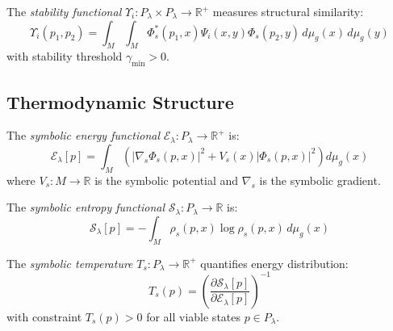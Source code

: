\begin{definition}
\label{definition:bk6_stability_functional_complete}
The \emph{stability functional} $\Upsilon_i : P_{\lambda} \times P_{\lambda} \to \mathbb{R}^+$ measures structural similarity:
\begin{equation}
\Upsilon_i(p_1, p_2) = \int_M \int_M \Phi_s^*(p_1, x) \Psi_i(x, y) \Phi_s(p_2, y) \, d\mu_g(x) \, d\mu_g(y)
\end{equation}
with stability threshold $\gamma_{\min} > 0$.
\end{definition}

\subsection{Thermodynamic Structure}
\label{subsection:bk6_thermodynamic_structure}

\begin{definition}
\label{definition:bk6_symbolic_energy_functional}
The \emph{symbolic energy functional} $\mathcal{E}_\lambda : P_\lambda \to \mathbb{R}^+$ is:
\begin{equation}
\mathcal{E}_\lambda[p] = \int_M \left(|\nabla_s \Phi_s(p,x)|^2 + V_s(x)|\Phi_s(p,x)|^2\right) d\mu_g(x)
\end{equation}
where $V_s : M \to \mathbb{R}$ is the symbolic potential and $\nabla_s$ is the symbolic gradient.
\end{definition}

\begin{definition}
\label{definition:bk6_symbolic_entropy_functional}
The \emph{symbolic entropy functional} $\mathcal{S}_\lambda : P_\lambda \to \mathbb{R}$ is:
\begin{equation}
\mathcal{S}_\lambda[p] = -\int_M \rho_s(p,x) \log \rho_s(p,x) \, d\mu_g(x)
\end{equation}
\end{definition}

\begin{definition}
\label{definition:bk6_symbolic_temperature}
The \emph{symbolic temperature} $T_s : P_\lambda \to \mathbb{R}^+$ quantifies energy distribution:
\begin{equation}
T_s(p) = \left(\frac{\partial \mathcal{S}_\lambda[p]}{\partial \mathcal{E}_\lambda[p]}\right)^{-1}
\end{equation}
with constraint $T_s(p) > 0$ for all viable states $p \in P_\lambda$.
\end{definition}


